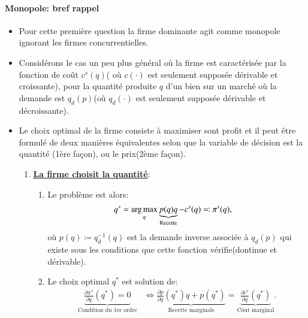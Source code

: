 \documentclass[notes, ignorenonframetext, compress, 9pt, xcolor=svgnames, aspectratio=169]{beamer}
\begin{document}
\begin{frame}
  [allowframebreaks]{\insertsection}
  \framesubtitle{Monopole: bref rappel}
  \begin{itemize}
  \item Pour cette première question la firme dominante agit comme monopole ignorant les firmes concurrentielles.
  \item Considérons le cas un peu plus général où la firme est caractérisée par la fonction de coût $c^s(q)$( où $c(\cdot)$ est seulement supposée dérivable et croissante), pour la quantité produite $q$ d'un bien sur un marché où la demande est $q_d(p)$(où $q_d(\cdot)$ est seulement supposée dérivable et décroissante).
  \item Le choix optimal de la firme consiste à maximiser sont profit et il peut être formulé de deux manières équivalentes selon que la variable de décision est la quantité (1ère façon), ou le prix(2ème façon).
  \begin{enumerate}
  \item \textbf{\underline{La firme choisit la quantité}}:
  \begin{enumerate}[$\cdot$]
  \item Le problème est alors:
  \begin{align}
  q^* &= \argmax_{q} \underbrace{p(q)q}_{\text{Recette}} - c^s(q)\eqqcolon \pi^s(q), \label{eq7}
  \end{align}
  où $p(q)\coloneqq q_d^{-1}(q)$ est la demande inverse associée à $q_d(p)$ qui existe sous les conditions que cette fonction vérifie(dontinue et dérivable).
  \item  Le choix optimal $q^*$ est solution de:
  \begin{align}
  \underbrace{\frac{\partial \pi^s}{\partial q}(q^*) = 0}_{\text{Condition du 1er ordre}} &\Leftrightarrow   \underbrace{\frac{\partial p}{\partial q}(q^*) q + p(q^*)}_{\text{Recette marginale}} = \underbrace{\frac{\partial c^s}{\partial q}(q^*)}_{\text{Côut marginal}}. 
  \label{eq8}
  \end{align}
  \end{enumerate}


\end{enumerate}
\end{itemize}
\end{frame}
\end{document}

